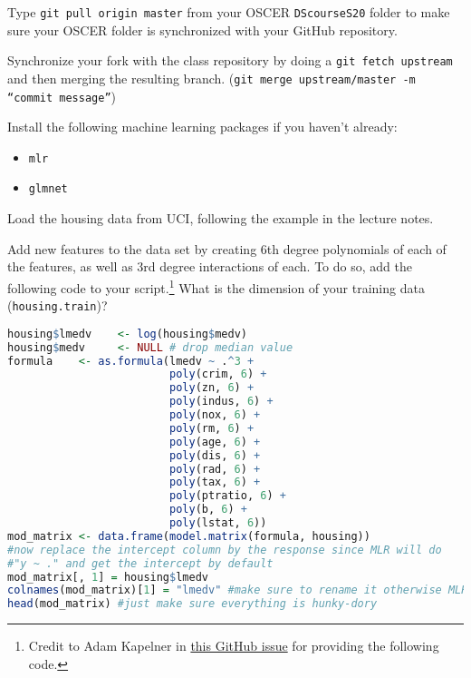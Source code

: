 \documentclass[12pt,english]{exam}
\begin{document}
\begin{questions}
\question Type \texttt{git pull origin master} from your OSCER \texttt{DScourseS20} folder to make sure your OSCER folder is synchronized with your GitHub repository. 

\question Synchronize your fork with the class repository by doing a \texttt{git fetch upstream} and then merging the resulting branch. (\texttt{git merge upstream/master -m ``commit message''})

\question Install the following machine learning packages if you haven't already:
\begin{itemize}
    \item \texttt{mlr}
    \item \texttt{glmnet}
\end{itemize}

\question Load the housing data from UCI, following the example in the lecture notes.

\question Add new features to the data set by creating 6th degree polynomials of each of the features, as well as 3rd degree interactions of each. To do so, add the following code to your script.\footnote{Credit to Adam Kapelner in \href{https://github.com/mlr-org/mlr/issues/564}{this GitHub issue} for providing the following code.} What is the dimension of your training data (\texttt{housing.train})?
\begin{lstlisting}[language=R]
housing$lmedv    <- log(housing$medv)
housing$medv     <- NULL # drop median value
formula    <- as.formula(lmedv ~ .^3 +
                         poly(crim, 6) + 
                         poly(zn, 6) + 
                         poly(indus, 6) + 
                         poly(nox, 6) + 
                         poly(rm, 6) +
                         poly(age, 6) + 
                         poly(dis, 6) +
                         poly(rad, 6) + 
                         poly(tax, 6) + 
                         poly(ptratio, 6) + 
                         poly(b, 6) + 
                         poly(lstat, 6))
mod_matrix <- data.frame(model.matrix(formula, housing))
#now replace the intercept column by the response since MLR will do 
#"y ~ ." and get the intercept by default
mod_matrix[, 1] = housing$lmedv
colnames(mod_matrix)[1] = "lmedv" #make sure to rename it otherwise MLR won't find it
head(mod_matrix) #just make sure everything is hunky-dory


\end{lstlisting}
\end{questions}
\end{document}
